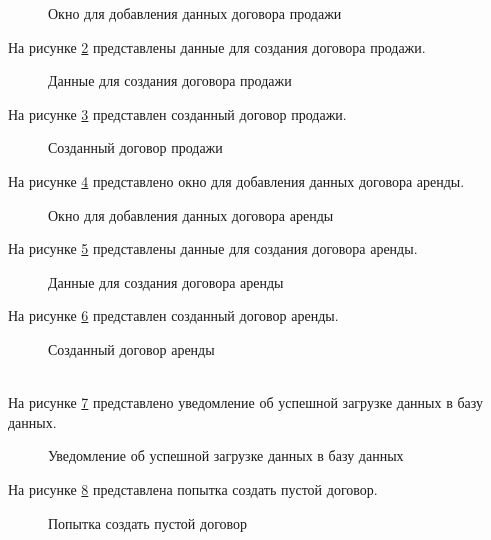 \begin{figure}[H]
	\caption{Окно для добавления данных договора продажи}
	\label{продажи:image}
\end{figure}

На рисунке \ref{рпродажи:image} представлены данные для создания договора продажи.

\begin{figure}[H]
	\caption{Данные для создания договора продажи}
	\label{рпродажи:image}
\end{figure}

На рисунке \ref{договорП:image} представлен созданный договор продажи.

\begin{figure}[H]
	\caption{Созданный договор продажи}
	\label{договорП:image}
\end{figure}

На рисунке \ref{аренда:image} представлено окно для добавления данных договора аренды.

\begin{figure}[H]
	\caption{Окно для добавления данных договора аренды}
	\label{аренда:image}
\end{figure}

На рисунке \ref{раренда:image} представлены данные для создания договора аренды.

\begin{figure}[H]
	\caption{Данные для создания договора аренды}
	\label{раренда:image}
\end{figure}

На рисунке \ref{даренда:image} представлен созданный договор аренды.

\begin{figure}[H]
	\caption{Созданный договор аренды}
	\label{даренда:image}
\end{figure}\\

На рисунке \ref{успех:image} представлено уведомление об успешной загрузке данных в базу данных.

\begin{figure}[H]
	\caption{Уведомление об успешной загрузке данных в базу данных}
	\label{успех:image}
\end{figure}

На рисунке \ref{пустой:image} представлена попытка создать пустой договор.

\begin{figure}[H]
	\caption{Попытка создать пустой договор}
	\label{пустой:image}
\end{figure}